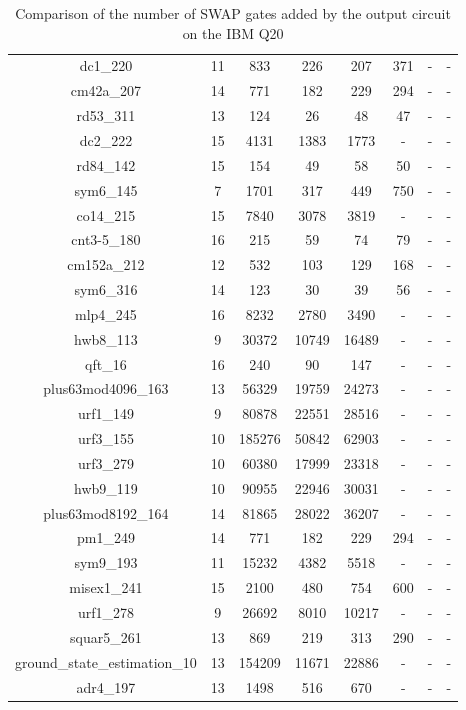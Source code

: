 \documentclass[runningheads]{llncs}
\begin{document}
\begin{table}[H]
\begin{center}
\begin{tabular}{|c|c|c|c|c|c|c|c|}
dc1\_220 & 11 & 833 & 226 & 207 & 371 & -& - \\
cm42a\_207 & 14 & 771 & 182 & 229 & 294 & -& - \\
rd53\_311 & 13 & 124 & 26 & 48 & 47 & -& - \\
dc2\_222 & 15 & 4131 & 1383 & 1773 & - & -& - \\
rd84\_142 & 15 & 154 & 49 & 58 & 50 & -& - \\
sym6\_145 & 7 & 1701 & 317 & 449 & 750 & -& - \\
co14\_215 & 15 & 7840 & 3078 & 3819 & - & -& - \\
cnt3-5\_180 & 16 & 215 & 59 & 74 & 79 & -& - \\
cm152a\_212 & 12 & 532 & 103 & 129 & 168 & -& - \\
sym6\_316 & 14 & 123 & 30 & 39 & 56 & -& - \\
mlp4\_245 & 16 & 8232 & 2780 & 3490 & - & -& - \\
hwb8\_113 & 9 & 30372 & 10749 & 16489 & - & -& - \\
qft\_16 & 16 & 240 & 90 & 147 & - & -& - \\
plus63mod4096\_163 & 13 & 56329 & 19759 & 24273 & - & -& - \\
urf1\_149 & 9 & 80878 & 22551 & 28516 & - & -& - \\
urf3\_155 & 10 & 185276 & 50842 & 62903 & - & -& - \\
urf3\_279 & 10 & 60380 & 17999 & 23318 & - & -& - \\
hwb9\_119 & 10 & 90955 & 22946 & 30031 & - & -& - \\
plus63mod8192\_164 & 14 & 81865 & 28022 & 36207 & - & -& - \\
pm1\_249 & 14 & 771 & 182 & 229 & 294 & -& - \\
sym9\_193 & 11 & 15232 & 4382 & 5518 & - & -& - \\
misex1\_241 & 15 & 2100 & 480 & 754 & 600 & -& - \\
urf1\_278 & 9 & 26692 & 8010 & 10217 & - & -& - \\
squar5\_261 & 13 & 869 & 219 & 313 & 290 & -& - \\
ground\_state\_estimation\_10 & 13 & 154209 & 11671 & 22886 & - & -& - \\
adr4\_197 & 13 & 1498 & 516 & 670 & - & -& - \\
			\hline
			\end{tabular} 
			\end{center}	
			\caption{Comparison of  the number of SWAP gates added by the 
			output circuit on the IBM Q20 }
			\label{tab4}  
			\end{table}
\end{document}
